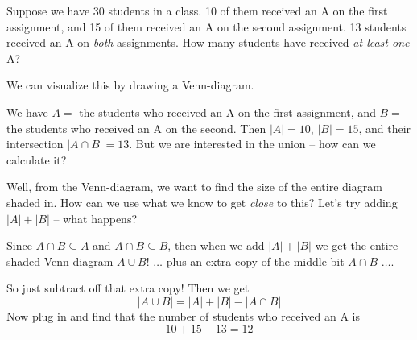 \documentclass[main.tex]{subfiles}
\begin{document}
\begin{example}
	Suppose we have 30 students in a class. 10 of them received an A on the first assignment, and 15 of them received an A on the second assignment. 13 students received an A on \textit{both} assignments. How many students have received \textit{at least one} A?
	
	We can visualize this by drawing a Venn-diagram.
	
	\begin{center}
	\end{center}
	
	We have \(A = \) the students who received an A on the first assignment, and \(B = \) the students who received an A on the second. Then \(|A| = 10\), \(|B| = 15\), and their intersection \(|A \cap B| = 13\). But we are interested in the union -- how can we calculate it?
	
	Well, from the Venn-diagram, we want to find the size of the entire diagram shaded in. How can we use what we know to get \textit{close} to this? Let's try adding \(|A| + |B|\) -- what happens?
	
	\begin{center}
	\end{center}
	
	Since \(A \cap B \subseteq A\) and \(A \cap B \subseteq B\), then when we add \(|A| + |B|\) we get the entire shaded Venn-diagram \(A \cup B\)! \(\dots\) plus an extra copy of the middle bit \(A \cap B\) \(\dots\).
	
	So just subtract off that extra copy! Then we get \[|A \cup B| = |A| + |B| - |A \cap B|\]
	Now plug in and find that the number of students who received an A is \[10 + 15 - 13 = 12\]
\end{example}
\end{document}
